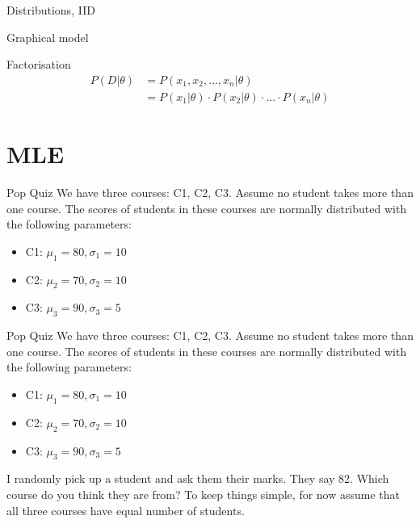 \documentclass{beamer}
\begin{document}
\begin{section}{Distributions, IID}
\begin{frame}{Graphical model}
        
    \end{frame}

    \begin{frame}{Factorisation}
        \begin{align*}
            P(D|\theta) & = P(x_1, x_2, \ldots, x_n | \theta) \\
            & = P(x_1|\theta) \cdot P(x_2|\theta) \cdot \ldots \cdot P(x_n|\theta)
        \end{align*}
        
    \end{frame}

\end{section}

\section{MLE}
\begin{frame}{Pop Quiz}
    We have three courses: C1, C2, C3. Assume no student takes more than one course.
    The scores of students in these courses are normally distributed with the following parameters:
    \begin{itemize}
        \item C1: $\mu_1 = 80, \sigma_1 = 10$
        \item C2: $\mu_2 = 70, \sigma_2 = 10$
        \item C3: $\mu_3 = 90, \sigma_3 = 5$
    \end{itemize}


    
\end{frame}

\begin{frame}{Pop Quiz}
    We have three courses: C1, C2, C3. Assume no student takes more than one course.
    The scores of students in these courses are normally distributed with the following parameters:
    \begin{itemize}
        \item C1: $\mu_1 = 80, \sigma_1 = 10$
        \item C2: $\mu_2 = 70, \sigma_2 = 10$
        \item C3: $\mu_3 = 90, \sigma_3 = 5$
    \end{itemize}

   
    I randomly pick up a student and ask them their marks. They say 82. Which course do you think they are from?
    To keep things simple, for now assume that all three courses have equal number of students.
    
    
    
\end{frame}
\end{document}
